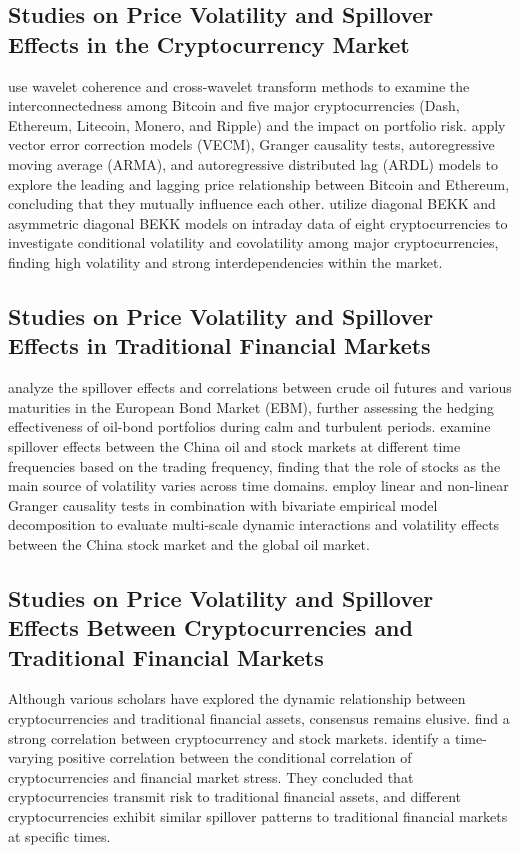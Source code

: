 \documentclass{article}
\begin{document}
\subsection{Studies on Price Volatility and Spillover Effects in the Cryptocurrency Market}
\cite{mensi2019cryptocurrency} use wavelet coherence and cross-wavelet transform methods to examine the interconnectedness among Bitcoin and five major cryptocurrencies (Dash, Ethereum, Litecoin, Monero, and Ripple) and the impact on portfolio risk. \cite{sifat2019} apply vector error correction models (VECM), Granger causality tests, autoregressive moving average (ARMA), and autoregressive distributed lag (ARDL) models to explore the leading and lagging price relationship between Bitcoin and Ethereum, concluding that they mutually influence each other. \cite{katsiampa2019} utilize diagonal BEKK and asymmetric diagonal BEKK models on intraday data of eight cryptocurrencies to investigate conditional volatility and covolatility among major cryptocurrencies, finding high volatility and strong interdependencies within the market.

\subsection{Studies on Price Volatility and Spillover Effects in Traditional Financial Markets}
\cite{mensi2021oil} analyze the spillover effects and correlations between crude oil futures and various maturities in the European Bond Market (EBM), further assessing the hedging effectiveness of oil-bond portfolios during calm and turbulent periods. \cite{sun2021spillover} examine spillover effects between the China oil and stock markets at different time frequencies based on the trading frequency, finding that the role of stocks as the main source of volatility varies across time domains. \cite{peng2020dynamic} employ linear and non-linear Granger causality tests in combination with bivariate empirical model decomposition to evaluate multi-scale dynamic interactions and volatility effects between the China stock market and the global oil market.

\subsection{Studies on Price Volatility and Spillover Effects Between Cryptocurrencies and Traditional Financial Markets}

Although various scholars have explored the dynamic relationship between cryptocurrencies and traditional financial assets, consensus remains elusive. \cite{dyhrberg2016b} find a strong correlation between cryptocurrency and stock markets. \cite{akyildirim2020relationship} identify a time-varying positive correlation between the conditional correlation of cryptocurrencies and financial market stress. They concluded that cryptocurrencies transmit risk to traditional financial assets, and different cryptocurrencies exhibit similar spillover patterns to traditional financial markets at specific times.
\end{document}
